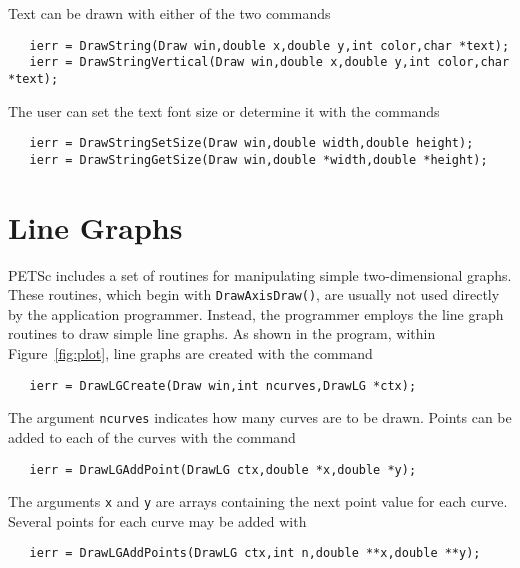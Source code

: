 Text can be drawn with either of the two 
commands  
\begin{verbatim}
   ierr = DrawString(Draw win,double x,double y,int color,char *text);
   ierr = DrawStringVertical(Draw win,double x,double y,int color,char *text);
\end{verbatim}
The user can set the text font size or determine it with the 
commands  
\begin{verbatim}
   ierr = DrawStringSetSize(Draw win,double width,double height);
   ierr = DrawStringGetSize(Draw win,double *width,double *height);
\end{verbatim}

\section{Line Graphs}
PETSc includes a set of routines for manipulating simple two-dimensional
graphs. These routines, which begin with {\tt DrawAxisDraw()}, are usually 
not used directly by the application programmer.  Instead, the programmer 
employs the line graph routines to draw simple line graphs.
As shown in the program, within Figure~\ref{fig:plot}, line graphs 
are created with the command  
\begin{verbatim}
   ierr = DrawLGCreate(Draw win,int ncurves,DrawLG *ctx);
\end{verbatim}
The argument {\tt ncurves} indicates how many curves are to be drawn.
Points can be added to each of the curves with the 
command 
\begin{verbatim}
   ierr = DrawLGAddPoint(DrawLG ctx,double *x,double *y);
\end{verbatim}
The arguments {\tt x} and {\tt y} are arrays containing the next 
point value for each curve.
Several points for each curve may be added with 
\begin{verbatim}
   ierr = DrawLGAddPoints(DrawLG ctx,int n,double **x,double **y);
\end{verbatim}

